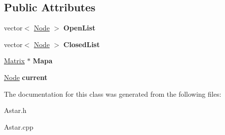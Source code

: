 \subsection*{Public Attributes}
\begin{DoxyCompactItemize}
\item 
\hypertarget{class_astar_a318fbaf1e03319281b454caac6710361}{vector$<$ \hyperlink{class_node}{Node} $>$ {\bfseries Open\+List}}\label{class_astar_a318fbaf1e03319281b454caac6710361}

\item 
\hypertarget{class_astar_a6b15d8a00431db17af288977ee4b9fca}{vector$<$ \hyperlink{class_node}{Node} $>$ {\bfseries Closed\+List}}\label{class_astar_a6b15d8a00431db17af288977ee4b9fca}

\item 
\hypertarget{class_astar_a5d1206b313064705051e9c2607afad94}{\hyperlink{class_matrix}{Matrix} $\ast$ {\bfseries Mapa}}\label{class_astar_a5d1206b313064705051e9c2607afad94}

\item 
\hypertarget{class_astar_a943695a46f99f1617891efdab1a5d9c7}{\hyperlink{class_node}{Node} {\bfseries current}}\label{class_astar_a943695a46f99f1617891efdab1a5d9c7}

\end{DoxyCompactItemize}


The documentation for this class was generated from the following files\+:\begin{DoxyCompactItemize}
\item 
Astar.\+h\item 
Astar.\+cpp\end{DoxyCompactItemize}
